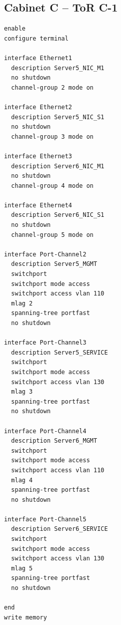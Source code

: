 \subsection{Cabinet C -- ToR C-1}
\begin{lstlisting}[caption={ToR C-1: downlinks to Servers 5 and 6.},basicstyle=\ttfamily\footnotesize,breaklines=true]
enable
configure terminal

interface Ethernet1
  description Server5_NIC_M1
  no shutdown
  channel-group 2 mode on

interface Ethernet2
  description Server5_NIC_S1
  no shutdown
  channel-group 3 mode on

interface Ethernet3
  description Server6_NIC_M1
  no shutdown
  channel-group 4 mode on

interface Ethernet4
  description Server6_NIC_S1
  no shutdown
  channel-group 5 mode on

interface Port-Channel2
  description Server5_MGMT
  switchport
  switchport mode access
  switchport access vlan 110
  mlag 2
  spanning-tree portfast
  no shutdown

interface Port-Channel3
  description Server5_SERVICE
  switchport
  switchport mode access
  switchport access vlan 130
  mlag 3
  spanning-tree portfast
  no shutdown

interface Port-Channel4
  description Server6_MGMT
  switchport
  switchport mode access
  switchport access vlan 110
  mlag 4
  spanning-tree portfast
  no shutdown

interface Port-Channel5
  description Server6_SERVICE
  switchport
  switchport mode access
  switchport access vlan 130
  mlag 5
  spanning-tree portfast
  no shutdown

end
write memory
\end{lstlisting}

